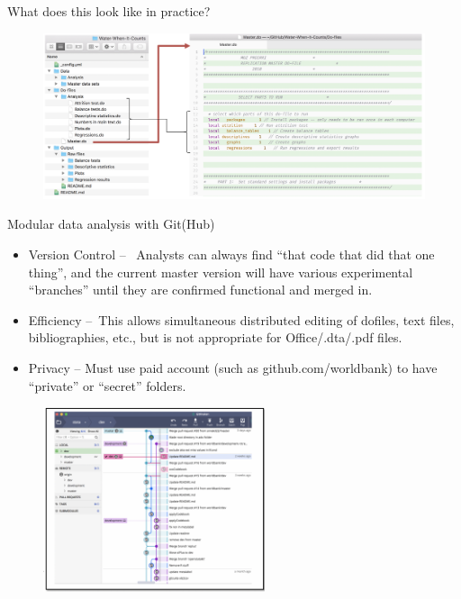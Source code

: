 \documentclass[aspectratio=169]{beamer}
\begin{document}
\begin{frame}{What does this look like in practice?}
\begin{figure}
	\centering
	\includegraphics[width=\linewidth]{img/Structure2}
\end{figure}
\end{frame}


\begin{frame}[fragile]{Modular data analysis with Git(Hub)}
\begin{multicols}{2}	
	
	\begin{itemize}[<default overlay specification>]
		\item<1> Version Control –  Analysts can always find “that code that did that one thing”, and the current master version will have various experimental “branches” until they are confirmed functional and merged in.

		\item<1>  Efficiency – This allows simultaneous distributed editing of dofiles, text files, bibliographies, etc., but is not appropriate for Office/.dta/.pdf files.
		\item<1>  Privacy – Must use paid account (such as github.com/worldbank) to have “private” or “secret” folders. 
	\end{itemize}
	
	\begin{figure}
		\centering
		\includegraphics[width=65mm, right]{img/Structure3}
	\end{figure}
	
\end{multicols}
\end{frame}
\end{document}
